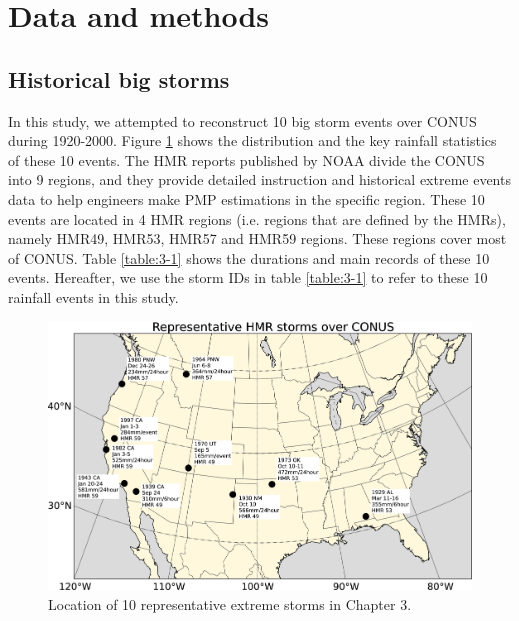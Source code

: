 \section{Data and methods}

\subsection{Historical big storms}

In this study, we attempted to reconstruct 10 big storm events over CONUS during 1920-2000. Figure \ref{fig:3-1} shows the distribution and the key rainfall statistics of these 10 events. The HMR reports published by NOAA divide the CONUS into 9 regions, and they provide detailed instruction and historical extreme events data to help engineers make PMP estimations in the specific region. These 10 events are located in 4 HMR regions (i.e. regions that are defined by the HMRs), namely HMR49, HMR53, HMR57 and HMR59 regions. These regions cover most of CONUS. Table \ref{table:3-1} shows the durations and main records of these 10 events. Hereafter, we use the storm IDs in table \ref{table:3-1} to refer to these 10 rainfall events in this study.

\begin{figure}[htbp]
	\includegraphics[width=\linewidth]{pics/ch3/fig1.jpg}
	\caption{Location of 10 representative extreme storms in Chapter 3.}
	\label{fig:3-1}
\end{figure}


